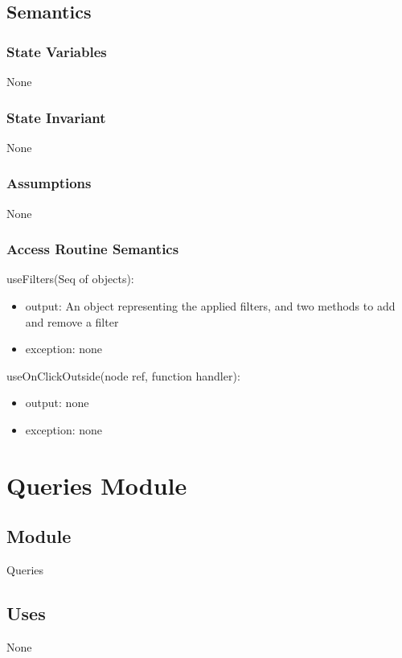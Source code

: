 \documentclass[12pt]{article}
\begin{document}
\subsection{Semantics}

\subsubsection{State Variables}

None

\subsubsection{State Invariant}

None

\subsubsection{Assumptions}

None

\subsubsection{Access Routine Semantics}


\noindent useFilters(Seq of objects):
\begin{itemize}
\item output: An object representing the applied filters, and two methods to add and remove a filter
\item exception: none
\end{itemize}

\noindent useOnClickOutside(node ref, function handler):
\begin{itemize}
\item output: none
\item exception: none
\end{itemize}



\newpage

\section{Queries Module}

\subsection{Module}
Queries

\subsection{Uses}
None
\end{document}
